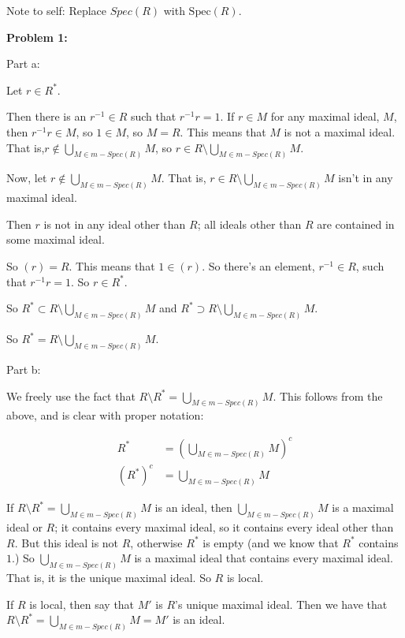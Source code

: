 \documentclass[a4paper,12pt]{article}
\newcommand{\tab}{\hspace{4mm}} %
\newcommand{\shunt}{\vspace{20mm}}
\begin{document}
Note to self: Replace $Spec(R)$ with $\text{Spec}(R)$. 

{\bf Problem 1:} %

Part a:

Let $r \in R^*$.

\tab Then there is an $r^{-1} \in R$ such that $r^{-1}r = 1$. If $r \in M$ for any maximal ideal, $M$, then $r^{-1}r \in M$, so $1 \in M$, so $M = R$. This means that $M$ is not a maximal ideal. That is,$r \notin \bigcup\limits_{M \in m-Spec(R)} M$, so $r \in R \setminus \bigcup\limits_{M \in m-Spec(R)} M$.

Now, let $r \notin \bigcup\limits_{M \in m-Spec(R)} M$. That is, $r \in R \setminus \bigcup\limits_{M \in m-Spec(R)} M$ isn't in any maximal ideal.

\tab Then $r$ is not in any ideal other than $R$; all ideals other than $R$ are contained in some maximal ideal.

\tab So $(r) = R$. This means that $1 \in (r)$. So there's an element, $r^{-1} \in R$, such that $r^{-1}r = 1$. So $r \in R^*$.

So $R^* \subset R \setminus \bigcup\limits_{M \in m-Spec(R)} M$ and $R^* \supset R \setminus \bigcup\limits_{M \in m-Spec(R)} M$.

So $R^* = R \setminus \bigcup\limits_{M \in m-Spec(R)} M$.

\shunt

Part b:

We freely use the fact that $R \setminus R^* = \bigcup\limits_{M \in m-Spec(R)} M$. This follows from the above, and is clear with proper notation:

\begin{align*}
R^* &= \left(\bigcup\limits_{M \in m-Spec(R)} M\right)^c \\
(R^*)^c &= \bigcup\limits_{M \in m-Spec(R)} M
\end{align*}

If $R \setminus R^* = \bigcup\limits_{M \in m-Spec(R)} M$ is an ideal, then $\bigcup\limits_{M \in m-Spec(R)} M$ is a maximal ideal or $R$; it contains every maximal ideal, so it contains every ideal other than $R$. But this ideal is not $R$, otherwise $R^*$ is empty (and we know that $R^*$ contains $1$.) So $\bigcup\limits_{M \in m-Spec(R)} M$ is a maximal ideal that contains every maximal ideal. That is, it is the unique maximal ideal. So $R$ is local.

If $R$ is local, then say that $M'$ is $R$'s unique maximal ideal. Then we have that $R \setminus R^* = \bigcup\limits_{M \in m-Spec(R)} M = M'$ is an ideal. 
\end{document}
